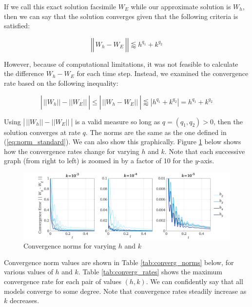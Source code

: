 \documentclass[12pt]{article}
\begin{document}
If we call this exact solution facsimile $W_E$ while our approximate solution is $W_h$, then we can say that the solution converges given that the following criteria is satisfied:

\begin{equation}
\left|\left|\frac{}{} W_h - W_E ~\right|\right| \lessapprox h^{q_1} + k^{q_2} 
\end{equation}

However, because of computational limitations, it was not feasible to calculate the difference $W_h-W_E$ for each time step. Instead, we examined the convergence rate based on the following inequality:

\begin{equation}
\left|\frac{}{} ||W_h|| - ||W_E|| ~\right| \leq \left|\frac{}{} || W_h - W_E|| ~ \right|  \lessapprox \left|h^{q_1} + k^{q_2}\right| = h^{q_1} + k^{q_2}
\end{equation}

\noindent Using $\left|\frac{}{} ||W_h|| - ||W_E|| ~\right|$ is a valid measure so long as $q=(q_1,q_2) > 0$, then the solution converges at rate $q$. The norms are the same as the one defined in (\ref{eq:norm_standard}). We can also show this graphically. Figure \ref{fig:convergence} below shows how the convergence rates change for varying $h$ and $k$. Note that each successive graph (from right to left) is zoomed in by a factor of 10 for the $y$-axis.

\begin{figure}[H]
	\includegraphics[width=\linewidth, trim=2.5cm 0 .5cm 0,clip]{images/norms_1.png}
	\caption{Convergence norms for varying $h$ and $k$}\label{fig:convergence}
\end{figure}

Convergence norm values are shown in Table \ref{tab:converg_norms} below, for various values of $h$ and $k$. Table \ref{tab:converg_rates} shows the maximum convergence rate for each pair of values $(h,k)$. We can confidently say that all models converge to some degree. Note that convergence rates steadily increase as $k$ decreases.
\end{document}
